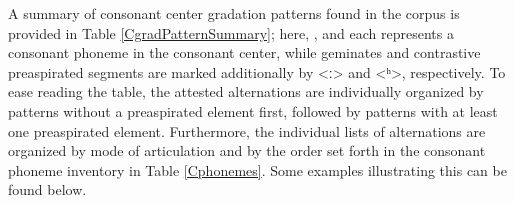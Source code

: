 A summary of consonant center gradation patterns found in the corpus is provided in Table \vref{CgradPatternSummary}; here, ,  and  each represents a consonant phoneme in the consonant center, while geminates and contrastive preaspirated segments are marked additionally by <ː> and <ʰ>, respectively. %
To ease reading the table, the attested alternations are individually organized by patterns without a preaspirated element first, followed by patterns with at least one preaspirated element. Furthermore, the individual lists of alternations are organized by mode of articulation and by the order set forth in the consonant phoneme inventory in Table \vref{Cphonemes}. 
Some examples illustrating this can be found below. 
\newcommand{\Div}{‑}%
